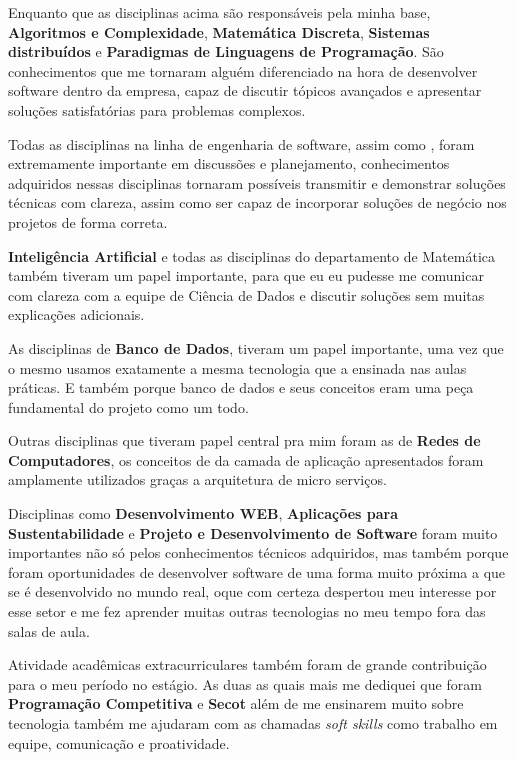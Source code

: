 \documentclass{ufscar}
\begin{document}
Enquanto que as disciplinas acima são responsáveis pela minha base, \textbf{Algoritmos e Complexidade}, \textbf{Matemática Discreta}, \textbf{Sistemas distribuídos} e \textbf{Paradigmas de Linguagens de Programação}. São conhecimentos que me tornaram alguém diferenciado na hora de desenvolver software dentro da empresa, capaz de discutir tópicos avançados e apresentar soluções satisfatórias para problemas complexos.

Todas as disciplinas na linha de engenharia de software, assim como , foram extremamente importante em discussões e planejamento, conhecimentos adquiridos nessas disciplinas tornaram possíveis transmitir e demonstrar soluções técnicas com clareza, assim como ser capaz de incorporar soluções de negócio nos projetos de forma correta. 

\textbf{Inteligência Artificial} e todas as disciplinas do departamento de Matemática também tiveram um papel importante, para que eu eu pudesse me comunicar com clareza com a equipe de Ciência de Dados e discutir soluções sem muitas explicações adicionais.

As disciplinas de \textbf{Banco de Dados}, tiveram um papel importante, uma vez que o mesmo usamos exatamente a mesma tecnologia que a ensinada nas aulas práticas. E também porque banco de dados e seus conceitos eram uma peça fundamental do projeto como um todo.

Outras disciplinas que tiveram papel central pra mim foram as de \textbf{Redes de Computadores}, os conceitos de da camada de aplicação apresentados foram amplamente utilizados graças a arquitetura de micro serviços. 

Disciplinas como \textbf{Desenvolvimento WEB}, \textbf{Aplicações para Sustentabilidade} e \textbf{Projeto e Desenvolvimento de Software} foram muito importantes não só pelos conhecimentos técnicos adquiridos, mas também porque foram oportunidades de desenvolver software de uma forma muito próxima a que se é desenvolvido no mundo real, oque com certeza despertou meu interesse por esse setor e me fez aprender muitas outras tecnologias no meu tempo fora das salas de aula.

Atividade acadêmicas extracurriculares também foram de grande contribuição para o meu período no estágio. As duas as quais mais me dediquei que foram \textbf{Programação Competitiva} e \textbf{Secot} além de me ensinarem muito sobre tecnologia também me ajudaram com as chamadas \textit{soft skills} como trabalho em equipe, comunicação e proatividade.
\end{document}
